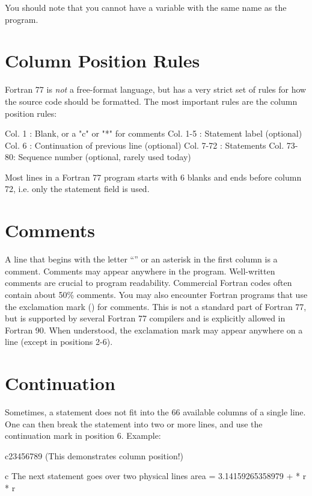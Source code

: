 You should note that you cannot have a variable with the same name as
the program.


\section*{Column Position Rules}

Fortran 77 is \textit{not} a free-format language, but has a very strict
set of rules for how the source code should be formatted. The most
important rules are the column position rules:

\begin{xminicode}
Col. 1    : Blank, or a "c" or "*" for comments
Col. 1-5  : Statement label (optional)
Col. 6    : Continuation of previous line (optional)
Col. 7-72 : Statements
Col. 73-80: Sequence number (optional, rarely used today)
\end{xminicode}

Most lines in a Fortran 77 program starts with 6 blanks and ends before
column 72, i.e. only the statement field is used.


\section*{Comments}

A line that begins with the letter ``'' or an
asterisk in the first column is a comment. Comments may appear anywhere
in the program. Well-written comments are crucial to program
readability. Commercial Fortran codes often contain about 50\% comments.
You may also encounter Fortran programs that use the exclamation mark
(\inlinefortranss{!}) for comments. This is not a standard part of
Fortran 77, but is supported by several Fortran 77 compilers and is
explicitly allowed in Fortran 90. When understood, the exclamation mark
may appear anywhere on a line (except in positions 2-6).


\section*{Continuation}

Sometimes, a statement does not fit into the 66 available columns of a
single line. One can then break the statement into two or more lines,
and use the continuation mark in position 6. Example:

\begin{fortran77}
c23456789 (This demonstrates column position!)

c The next statement goes over two physical lines
      area = 3.14159265358979
     +       * r * r
\end{fortran77}

